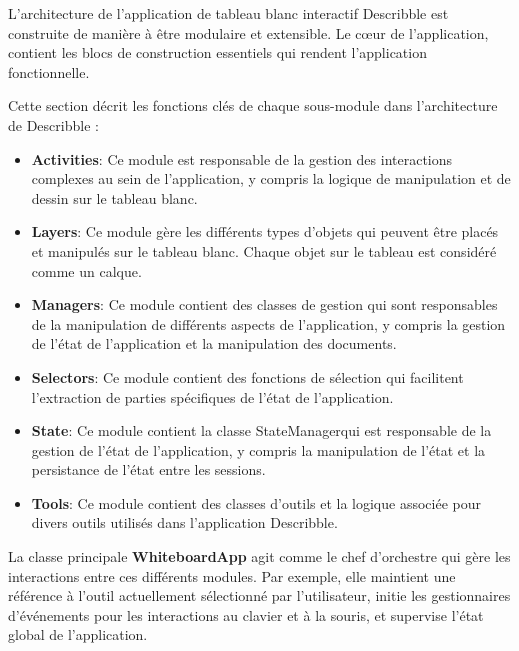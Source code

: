 L'architecture de l'application de tableau blanc interactif \gls{Describble} est construite de manière à être modulaire et extensible. Le c\oe{}ur de l'application, contient les blocs de construction essentiels qui rendent l'application fonctionnelle.

Cette section décrit les fonctions clés de chaque sous-module dans l'architecture de \gls{Describble} :

\begin{itemize}
    \item \textbf{Activities}: Ce module est responsable de la gestion des interactions complexes au sein de l'application, y compris la logique de manipulation et de dessin sur le tableau blanc.

    \item \textbf{Layers}: Ce module gère les différents types d'objets qui peuvent être placés et manipulés sur le tableau blanc. Chaque objet sur le tableau est considéré comme un calque.

    \item \textbf{Managers}: Ce module contient des classes de gestion qui sont responsables de la manipulation de différents aspects de l'application, y compris la gestion de l'état de l'application et la manipulation des documents.

    \item \textbf{Selectors}: Ce module contient des fonctions de sélection qui facilitent l'extraction de parties spécifiques de l'état de l'application.

    \item \textbf{State}: Ce module contient la classe \guillemotleft StateManager\guillemotright qui est responsable de la gestion de l'état de l'application, y compris la manipulation de l'état et la persistance de l'état entre les sessions.

    \item \textbf{Tools}: Ce module contient des classes d'outils et la logique associée pour divers outils utilisés dans l'application \gls{Describble}.
\end{itemize}

La classe principale \textbf{WhiteboardApp}  agit comme le chef d'orchestre qui gère les interactions entre ces différents modules. Par exemple, elle maintient une référence à l'outil actuellement sélectionné par l'utilisateur, initie les gestionnaires d'événements pour les interactions au clavier et à la souris, et supervise l'état global de l'application.

